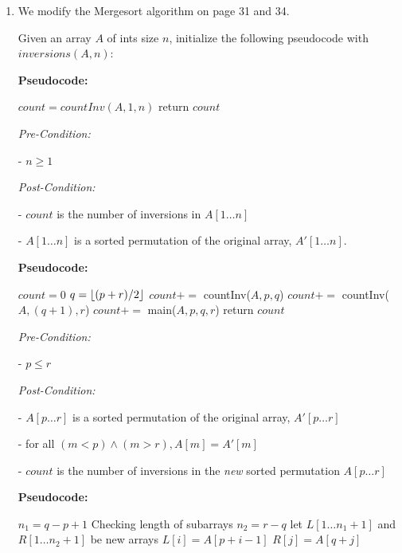 \documentclass[a4paper]{report}
\DeclarePairedDelimiter{\floor}{\lfloor}{\rfloor}
\begin{document}
\begin{enumerate}
    \item
      We modify the Mergesort algorithm on page 31 and 34.
      
      Given an array $A$ of ints size $n$, initialize the following pseudocode with $inversions(A, n)$: 

      {\bf Pseudocode:}
      \begin{algorithmic}[1]
          \State $count = countInv(A, 1, n)$
          \State return $count$
        \EndFunction
      \end{algorithmic}

      {\it Pre-Condition:}

       - $n \geq 1$

      {\it Post-Condition:}

        - $count$ is the number of inversions in  $A[1 \dots n]$

        - $A[1\dots n]$ is a sorted permutation of the original array, $A'[1\dots n]$.

      {\bf Pseudocode:}
      \begin{algorithmic}[1]
          \State $count = 0$
            \State $q = \floor{(p+r) / 2}$
            \State $count +=$ countInv($A, p, q$)
            \State $count +=$ countInv($A, (q+1), r$)
            \State $count +=$ main($A, p, q, r$)
          \EndIf
          \State return $count$
        \EndFunction
      \end{algorithmic}

      {\it Pre-Condition:}

       - $p \leq r$

      {\it Post-Condition:}

        - $A[p\dots r]$ is a sorted permutation of the original array, $A'[p \dots r]$

        - for all $(m < p) \wedge (m > r), A[m] = A'[m]$

        - $count$ is the number of inversions in the {\it new} sorted permutation $A[p \dots r]$

      



      {\bf Pseudocode:}
      \begin{algorithmic}[1]
          \State $n_{1} = q - p + 1$
          \Comment Checking length of subarrays
          \State $n_{2} = r - q$
          \State let $L[1\dots n_{1} + 1]$ and $R[1\dots n_2 + 1]$ be new arrays
            \State $L[i]  = A[p + i - 1]$
          \EndFor
            \State $R[j] = A[q + j]$
          \EndFor


\end{algorithmic}
\end{enumerate}
\end{document}

